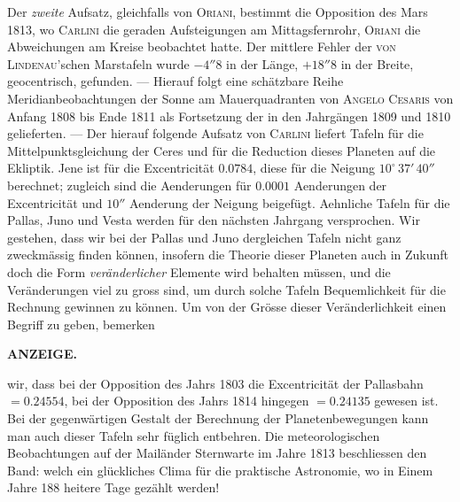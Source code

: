 Der \emph{zweite} Aufsatz, gleichfalls von \textsc{Oriani}, bestimmt die Opposition des Mars 1813, wo \textsc{Carlini} die geraden Aufsteigungen am Mittagsfernrohr, \textsc{Oriani} die Abweichungen am Kreise beobachtet hatte. Der mittlere Fehler der \textsc{von Lindenau}'schen Marstafeln wurde $-4''8$ in der Länge, $+18''8$ in der Breite, geocentrisch, gefunden. --- Hierauf folgt eine schätzbare Reihe Meridianbeobachtungen der Sonne am Mauerquadranten von \textsc{Angelo Cesaris} von Anfang 1808 bis Ende 1811 als Fortsetzung der in den Jahrgängen 1809 und 1810 gelieferten. --- Der hierauf folgende Aufsatz von \textsc{Carlini} liefert Tafeln für die Mittelpunktsgleichung der Ceres und für die Reduction dieses Planeten auf die Ekliptik. Jene ist für die Excentricität $0.0784$, diese für die Neigung $10^\circ\,37'\,40''$ berechnet; zugleich sind die Aenderungen für $0.0001$ Aenderungen der Excentricität und $10''$ Aenderung der Neigung beigefügt. Aehnliche Tafeln für die Pallas, Juno und Vesta werden für den nächsten Jahrgang versprochen. Wir gestehen, dass wir bei der Pallas und Juno dergleichen Tafeln nicht ganz zweckmässig finden können, insofern die Theorie dieser Planeten auch in Zukunft doch die Form \emph{veränderlicher} Elemente wird behalten müssen, und die Veränderungen viel zu gross sind, um durch solche Tafeln Bequemlichkeit für die Rechnung gewinnen zu können. Um von der Grösse dieser Veränderlichkeit einen Begriff zu geben, bemerken\par
\clearpage
{}
\noindent{}%
\parbox[b]{\dimexpr\textwidth-20mm\relax}{\centering\small\textbf{ANZEIGE.}}%
\makebox[10mm][r]{}\par\nobreak\medskip
\noindent wir, dass bei der Opposition des Jahrs 1803 die Excentricität der Pallasbahn $=0.24554$, bei der
Opposition des Jahrs 1814 hingegen $=0.24135$ gewesen ist. Bei der gegenwärtigen Gestalt der
Berechnung der Planetenbewegungen kann man auch dieser Tafeln sehr füglich entbehren. Die
meteorologischen Beobachtungen auf der Mailänder Sternwarte im Jahre 1813 beschliessen den Band:
welch ein glückliches Clima für die praktische Astronomie, wo in Einem Jahre 188 heitere Tage
gezählt werden!

